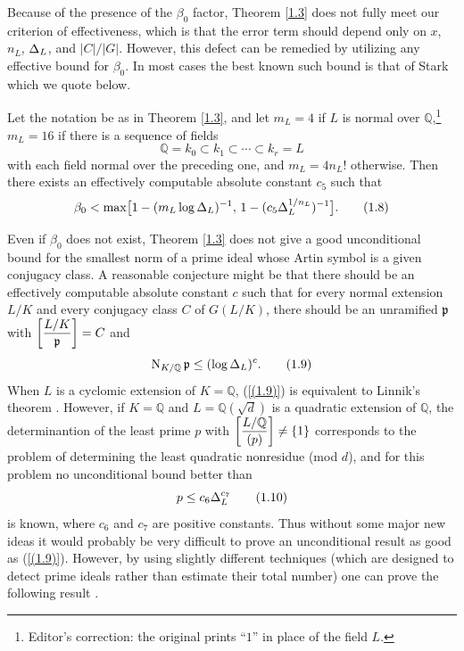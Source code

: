 \documentclass[./main]{subfiles}
\begin{document}
Because of the presence of the $\beta_0$ factor, Theorem \ref{1.3} does not fully meet our criterion of effectiveness, which is that the error term should depend only on $x$, $n_L$, $\Delta_L$, and $|C|/|G|$. However, this defect can be remedied by utilizing any effective bound for $\beta_0$. In most cases the best known such bound is that of Stark \cite[p.148]{13-Stark1974} which we quote below.

\begin{theorem}\label{1.4}
Let the notation be as in Theorem \ref{1.3}, and let $m_L = 4$ if $L$ is normal over $\mathbb Q$,\footnote{Editor's correction: the original prints ``$1$'' in place of the field $L$.} $m_L = 16$ if there is a sequence of fields \[\mathbb Q = k_0 \subset k_1 \subset \cdots \subset k_r = L\] with each field normal over the preceding one, and $m_L = 4n_L!$ otherwise. Then there exists an effectively computable absolute constant $c_5$ such that
\[ \beta_0 < \max \bigl[1- (m_L\log\Delta_L)^{-1},\, 1-(c_5\Delta_L^{1/n_L})^{-1}\bigr]. \tag{1.8}\label{(1.8)} \]
\end{theorem}

Even if $\beta_0$ does not exist, Theorem \ref{1.3} does not give a good unconditional bound for the smallest norm of a prime ideal whose Artin symbol is a given conjugacy class. A reasonable conjecture might be that there should be an effectively computable absolute constant $c$ such that for every normal extension $L/K$ and every conjugacy class $C$ of $G(L/K)$, there should be an unramified $\mathfrak{p}$ with $\bigg[\dfrac{L/K}{\mathfrak{p}}\bigg] = C$ and 
\[ \operatorname{N}_{K/\mathbb Q}\mathfrak{p} \le (\log \Delta_L)^c. \tag{1.9}\label{(1.9)} \]
When $L$ is a cyclomic extension of $K = \mathbb Q$, (\ref{(1.9)}) is equivalent to Linnik's theorem \cite[p.39]{1-Bombieri1974}. However, if $K = \mathbb Q$ and $L = \mathbb Q(\sqrt{d})$ is a quadratic extension of $\mathbb Q$, the determinantion of the least prime $p$ with $\bigg[\dfrac{L/\mathbb Q}{(p)}\bigg] \ne \{1\}$ corresponds to the problem of determining the least quadratic nonresidue (mod $d$), and for this problem no unconditional bound better than
\[ p \le c_6 \Delta_L^{c_7} \tag{1.10}\label{(1.10)} \]
is known, where $c_6$ and $c_7$ are positive constants. Thus without some major new ideas it would probably be very difficult to prove an unconditional result as good as (\ref{(1.9)}). However, by using slightly different techniques (which are designed to detect prime ideals rather than estimate their total number) one can prove the following result \cite{7-lagarias1979}.
\end{document}
